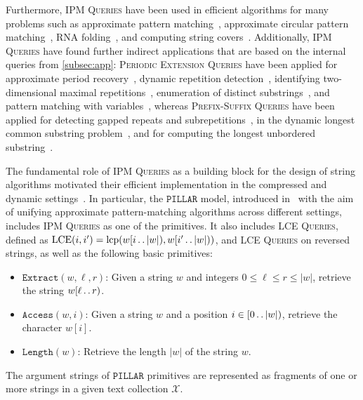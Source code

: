 \documentclass[a4paper]{article}
\theoremstyle{definition}
\theoremstyle{remark}
\newcommand{\IPM}{\textsc{IPM Queries}\xspace}
\newcommand{\BQ}{\textsc{Prefix-Suffix Queries}\xspace}
\newcommand{\PEQ}{\textsc{Periodic Extension Queries}\xspace}
\newcommand{\LCEQ}{\textsc{LCE Queries}\xspace}
\newcommand{\LCE}{\operatorname{LCE}\xspace}
\newcommand{\pillar}{\ensuremath{\mathtt{PILLAR}}\xspace}
\newcommand{\lcp}{\operatorname{lcp}}
\newcommand{\dd}{\mathinner{\ldotp\ldotp}}
\begin{document}
Furthermore, \IPM have been used in efficient algorithms for many problems such
as approximate pattern matching~\cite{DBLP:conf/focs/Charalampopoulos20,DBLP:conf/focs/Charalampopoulos22},
approximate circular pattern matching~\cite{DBLP:journals/jcss/Charalampopoulos21,DBLP:conf/esa/Charalampopoulos22},
RNA folding~\cite{DBLP:conf/icalp/0001KS22},
and computing string covers~\cite{DBLP:conf/esa/RadoszewskiS20}.
Additionally, \IPM have found further indirect applications that are based on the internal queries from \cref{subsec:app}:
\PEQ have been applied for
approximate period recovery~\cite{DBLP:journals/tcs/AmirALS18,DBLP:journals/algorithmica/AmirBKLS22},
dynamic repetition detection~\cite{DBLP:conf/esa/AmirBCK19},
identifying two-dimensional maximal repetitions~\cite{DBLP:conf/esa/AmirLMS18},
enumeration of distinct substrings~\cite{DBLP:conf/spire/Charalampopoulos20},
and pattern matching with variables~\cite{DBLP:journals/toct/FernauMMS20,DBLP:conf/spire/KosolobovMN17},
whereas
\BQ have been applied for detecting gapped repeats and subrepetitions~\cite{DBLP:journals/jda/KolpakovPPK17,DBLP:journals/mst/GawrychowskiIIK18},
in the dynamic longest common substring problem~\cite{DBLP:journals/corr/abs-1804-08731},
and for computing the longest unbordered substring~\cite{DBLP:journals/corr/abs-1805-09924}.

The fundamental role of \IPM as a building block for the design of string algorithms
motivated their efficient implementation in the compressed and dynamic settings~\cite{DBLP:conf/focs/Charalampopoulos20}.
In particular, the \pillar model, introduced in~\cite{DBLP:conf/focs/Charalampopoulos20}
with the aim of unifying approximate pattern-matching algorithms across different settings, includes \IPM as one of the primitives.
It also includes \LCEQ, defined as $\LCE(i,i')=\lcp(w[i\dd |w|),w[i'\dd |w|))$, and \LCEQ on reversed strings,
as well as the following basic primitives:
\begin{itemize}
  \item $\mathtt{Extract}(w,\ell,r)$: Given a string $w$ and integers $0\le \ell \le r \le |w|$, retrieve the string $w[\ell\dd r)$.
  \item $\mathtt{Access}(w,i)$: Given a string $w$ and a position $i\in [0\dd |w|)$, retrieve the character $w[i]$.
  \item $\mathtt{Length}(w)$: Retrieve the length $|w|$ of the string $w$.
\end{itemize}
The argument strings of \pillar primitives are represented as fragments of one or more strings in a given text collection $\mathcal{X}$.
\end{document}
